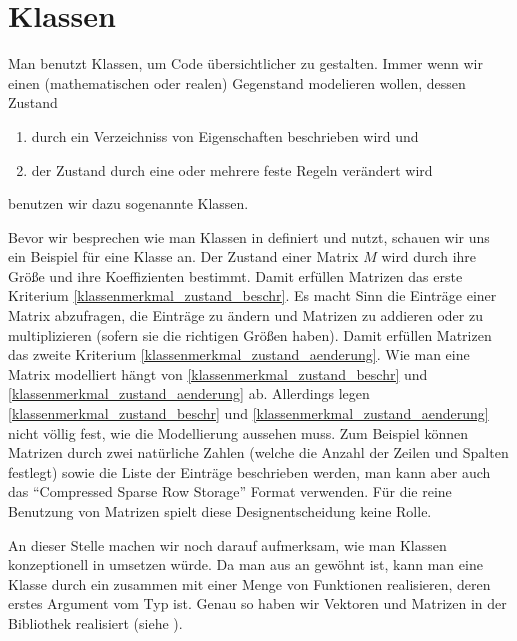 \section{Klassen}
\label{section:klassen}

Man benutzt Klassen, um Code übersichtlicher zu gestalten.
Immer wenn wir einen (mathematischen oder realen) Gegenstand modelieren wollen, dessen Zustand
\begin{enumerate}[label=\textbf{(K\arabic*})]
  \item \label{klassenmerkmal_zustand_beschr} durch ein Verzeichniss von Eigenschaften beschrieben wird und
  \item \label{klassenmerkmal_zustand_aenderung} der Zustand durch eine oder mehrere feste Regeln verändert wird
\end{enumerate}
benutzen wir dazu sogenannte Klassen.

Bevor wir besprechen wie man Klassen in \Python definiert und nutzt, schauen wir uns ein Beispiel für eine Klasse an.
Der Zustand einer Matrix $M$ wird durch ihre Größe und ihre Koeffizienten bestimmt.
Damit erfüllen Matrizen das erste Kriterium \ref{klassenmerkmal_zustand_beschr}.
Es macht Sinn die Einträge einer Matrix abzufragen, die Einträge zu ändern und Matrizen zu addieren oder zu multiplizieren (sofern sie die richtigen Größen haben).
Damit erfüllen Matrizen das zweite Kriterium \ref{klassenmerkmal_zustand_aenderung}.
Wie man eine Matrix modelliert hängt von \ref{klassenmerkmal_zustand_beschr} und \ref{klassenmerkmal_zustand_aenderung} ab.
Allerdings legen \ref{klassenmerkmal_zustand_beschr} und \ref{klassenmerkmal_zustand_aenderung} nicht völlig fest, wie die Modellierung aussehen muss.
Zum Beispiel können Matrizen durch zwei natürliche Zahlen (welche die Anzahl der Zeilen und Spalten festlegt) sowie die Liste der Einträge beschrieben werden,
man kann aber auch das ``Compressed Sparse Row Storage'' Format verwenden.
Für die reine Benutzung von Matrizen spielt diese Designentscheidung keine Rolle.

An dieser Stelle machen wir noch darauf aufmerksam, wie man Klassen konzeptionell in \C umsetzen würde.
Da man aus \C an  gewöhnt ist, kann man eine Klasse durch ein  zusammen mit einer Menge von Funktionen realisieren, deren erstes Argument vom Typ  ist.
Genau so haben wir Vektoren und Matrizen in der Bibliothek  realisiert (siehe \cite{joelixC}).






